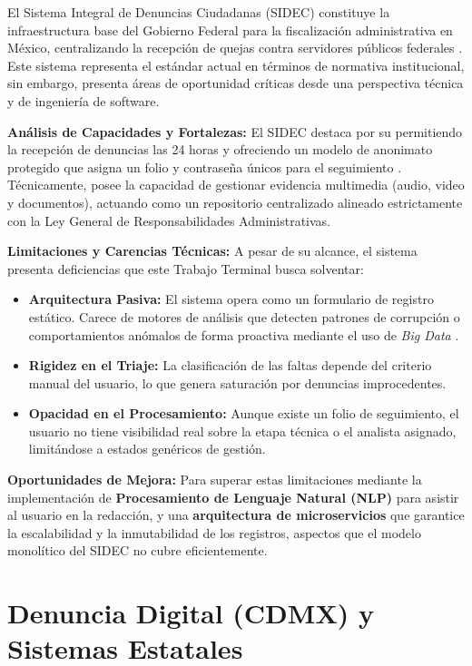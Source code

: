 \begin{flushleft}
\justifying
El Sistema Integral de Denuncias Ciudadanas (SIDEC) constituye la infraestructura base del Gobierno Federal para la fiscalización administrativa en México, centralizando la recepción de quejas contra servidores públicos federales \cite{6}. Este sistema representa el estándar actual en términos de normativa institucional, sin embargo, presenta áreas de oportunidad críticas desde una perspectiva técnica y de ingeniería de software.

\textbf{Análisis de Capacidades y Fortalezas:}
El SIDEC destaca por su permitiendo la recepción de denuncias las 24 horas y ofreciendo un modelo de anonimato protegido que asigna un folio y contraseña únicos para el seguimiento \cite{7}. Técnicamente, posee la capacidad de gestionar evidencia multimedia (audio, video y documentos), actuando como un repositorio centralizado alineado estrictamente con la Ley General de Responsabilidades Administrativas.

\textbf{Limitaciones y Carencias Técnicas:}
A pesar de su alcance, el sistema presenta deficiencias que este Trabajo Terminal busca solventar:
\begin{itemize}
    \item \textbf{Arquitectura Pasiva:} El sistema opera como un formulario de registro estático. Carece de motores de análisis que detecten patrones de corrupción o comportamientos anómalos de forma proactiva mediante el uso de \textit{Big Data} \cite{8}.
    \item \textbf{Rigidez en el Triaje:} La clasificación de las faltas depende del criterio manual del usuario, lo que genera saturación por denuncias improcedentes.
    \item \textbf{Opacidad en el Procesamiento:} Aunque existe un folio de seguimiento, el usuario no tiene visibilidad real sobre la etapa técnica o el analista asignado, limitándose a estados genéricos de gestión.
\end{itemize}

\textbf{Oportunidades de Mejora:} 
Para superar estas limitaciones mediante la implementación de \textbf{Procesamiento de Lenguaje Natural (NLP)} para asistir al usuario en la redacción, y una \textbf{arquitectura de microservicios} que garantice la escalabilidad y la inmutabilidad de los registros, aspectos que el modelo monolítico del SIDEC no cubre eficientemente.
\end{flushleft}

\section{Denuncia Digital (CDMX) y Sistemas Estatales}

